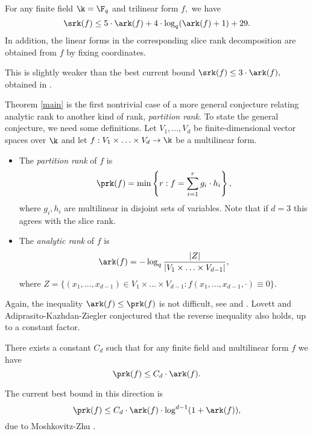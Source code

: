 \begin{theorem}\label{main} For any finite field $\k =\F_q$ and trilinear form $f,$ we have
$$\srk(f) \le 5\cdot \ark(f)+4\cdot \log_q(\ark(f)+1)+29.$$
In addition, the linear forms in the corresponding slice rank decomposition are obtained from $f$ by fixing coordinates.
\end{theorem}

\begin{remark}
    This is slightly weaker than the best current bound $\srk(f) \le 3\cdot\ark(f),$ obtained in \cite{AKZ}.
\end{remark}

Theorem \ref{main} is the first nontrivial case of a more general conjecture relating analytic rank to another kind of rank, \emph{partition rank}. To state the general conjecture, we need some definitions. Let $V_1,\ldots,V_d$ be finite-dimensional vector spaces over $\k$ and let $f:V_1\times\ldots\times V_d\to \k$ be a multilinear form.

\begin{definition}
    \begin{itemize}
    \item The \emph{partition rank} of $f$ is 
    \[
    \prk(f) = \min\left\{r: f = \sum_{i=1}^r g_i\cdot h_i\right\},
    \]
    where $g_i,h_i$ are multilinear in disjoint sets of variables. Note that if $d=3$ this agrees with the slice rank.
    \item The \emph{analytic rank} of $f$ is 
    \[
    \ark(f) = -\log_q \frac{|Z|}{|V_1\times\ldots\times V_{d-1}|},
    \]
    where $Z = \{(x_1,\ldots,x_{d-1})\in V_1\times\ldots\times V_{d-1}: f(x_1,\ldots,x_{d-1},\cdot) \equiv 0\}.$
\end{itemize}
    
\end{definition}

Again, the inequality $\ark(f)\le \prk(f)$ is not difficult, see \cite{KZ} and \cite{L}.  Lovett \cite{L} and Adiprasito-Kazhdan-Ziegler \cite{AKZ} conjectured that the reverse inequality also holds, up to a constant factor.

\begin{conjecture}
    There exists a constant $C_d$ such that for any finite field and multilinear form $f$ we have 
    \[
    \prk(f) \le C_d\cdot \ark(f).
    \]
\end{conjecture}

The current best bound in this direction is 
$$\prk(f) \le C_d\cdot \ark(f) \cdot \log^{d-1}(1+\ark(f)),$$
due to Moshkovitz-Zhu \cite{MZ}.

